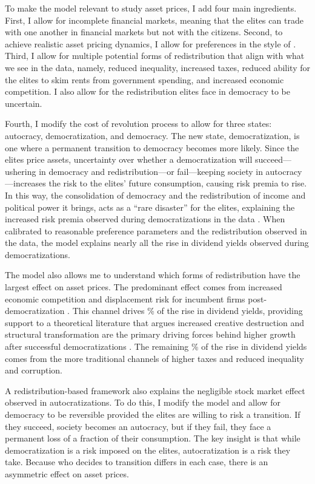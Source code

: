 To make the model relevant to study asset prices, I add four main ingredients. First, I allow for incomplete financial markets, meaning that the elites can trade with one another in financial markets but not with the citizens.  Second, to achieve realistic asset pricing dynamics, I allow for preferences in the style of \cite{Epstein1989}. Third, I allow for multiple potential forms of redistribution that align with what we see in the data, namely, reduced inequality, increased taxes, reduced ability for the elites to skim rents from government spending, and increased economic competition. I also allow for the redistribution elites face in democracy to be uncertain.

Fourth, I modify the cost of revolution process to allow for three states: autocracy, democratization, and democracy. The new state, democratization, is one where a permanent transition to democracy becomes more likely. Since the elites price assets, uncertainty over whether a democratization will succeed---ushering in democracy and redistribution---or fail---keeping society in autocracy---increases the risk to the elites' future consumption, causing risk premia to rise. In this way, the consolidation of democracy and the redistribution of income and political power it brings, acts as a ``rare disaster'' for the elites, explaining the increased risk premia observed during democratizations in the data \citep*{Rietz1988, Barro2006a,Gabaix2012,Wachter2013}.  When calibrated to reasonable preference parameters and the redistribution observed in the data, the model explains nearly all the rise in dividend yields observed during democratizations.

The model also allows me to understand which forms of redistribution have the largest effect on asset prices. The predominant effect comes from increased economic competition and displacement risk for incumbent firms post-democratization \citep*{Garleanu2012}. This channel drives \tabTwelveComp\% of the rise in dividend yields, providing support to a theoretical literature that argues increased creative destruction and structural transformation are the primary driving forces behind higher growth after successful democratizations \citep*{Aghion2008,Aghion2014,Acemoglu2015,Bravo2021}. The remaining \tabTwelveNonComp\% of the rise in dividend yields comes from the more traditional channels of higher taxes and reduced inequality and corruption. 

A redistribution-based framework also explains the negligible stock market effect observed in autocratizations. To do this, I modify the model and allow for democracy to be reversible provided the elites are willing to risk a transition. If they succeed, society becomes an autocracy, but if they fail, they face a permanent loss of a fraction of their consumption. The key insight is that while democratization is a risk imposed on the elites, autocratization is a risk they take. Because who decides to transition differs in each case, there is an asymmetric effect on asset prices.

